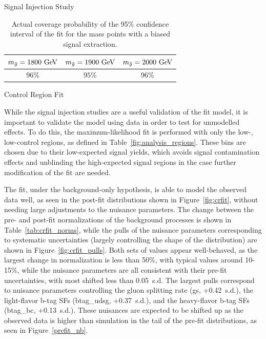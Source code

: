 \begin{section}{Signal Injection Study}
\begin{table}[tbp!]
\centering
\begin{tabular}{ |c|c|c| }
\hline
$m_{\tilde{g}} = 1800~\mathrm{Ge\kern -0.1em V}$ & $m_{\tilde{g}} = 1900~\mathrm{Ge\kern -0.1em V}$ & $m_{\tilde{g}} = 2000~\mathrm{Ge\kern -0.1em V}$ \\ \hline
$96\%$              & $95\%$              & $96\%$              \\ \hline
\end{tabular}
\caption{Actual coverage probability of the 95\% confidence interval of the fit for the mass points with a biased signal extraction.}
\label{tab:siginj_coverage}
\end{table}

\end{section}

\begin{section}{Control Region Fit}

While the signal injection studies are a useful validation of the fit model, it is important to validate the model using data in order to test for unmodelled effects.
To do this, the maximum-likelihood fit is performed with only the low-\Njets, low-\MJ control regions, as defined in Table~\ref{fig:analysis_regions}.
These bins are chosen due to their low-expected signal yields, which avoids signal contamination effects and unblinding the high-expected signal regions in the case further modification of the fit are needed.

The fit, under the background-only hypothesis, is able to model the observed data well, as seen in the post-fit \Nb distributions shown in Figure~\ref{fig:crfit}, without needing large adjustments to the nuisance parameters.
The change between the pre- and post-fit normalizations of the background processes is shown in Table~\ref{tab:crfit_norms}, while the pulls of the nuisance parameters corresponding to systematic uncertainties (largely controlling the shape of the \Nb distribution) are shown in Figure~\ref{fig:crfit_pulls}.
Both sets of values appear well-behaved, as the largest change in normalization is less than 50\%, with typical values around 10-15\%, while the nuisance parameters are all consistent with their pre-fit uncertainties, with most shifted less than 0.05~s.d.
The largest pulls correspond to nuisance parameters controlling the gluon splitting rate (gs, +0.42~s.d.), the light-flavor b-tag SFs (btag\_udsg, +0.37~s.d.), and the heavy-flavor b-tag SFs (btag\_bc, +0.13~s.d.).
These nuisances are expected to be shifted up as the observed data is higher than simulation in the tail of the pre-fit \Nb distributions, as seen in Figure~\ref{prefit_nb}.


\end{section}

